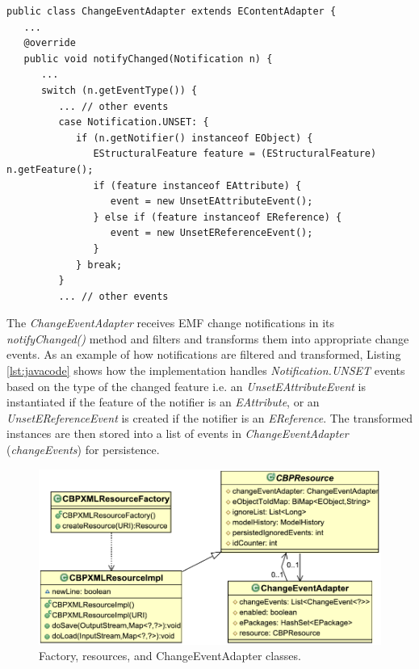 \documentclass[12pt, a4paper]{report} \usepackage[titletoc]{appendix}
\begin{document}
\begin{lstlisting}[style=java,caption={Simplified Java code to handle notification events.},label=lst:javacode]
public class ChangeEventAdapter extends EContentAdapter {
   ...
   @override
   public void notifyChanged(Notification n) {
      ...
      switch (n.getEventType()) {
         ... // other events
         case Notification.UNSET: {
            if (n.getNotifier() instanceof EObject) {
               EStructuralFeature feature = (EStructuralFeature) n.getFeature();
               if (feature instanceof EAttribute) {
                  event = new UnsetEAttributeEvent();
               } else if (feature instanceof EReference) {
                  event = new UnsetEReferenceEvent();
               }
            } break;
         } 
         ... // other events
\end{lstlisting}

The \emph{ChangeEventAdapter} receives EMF change notifications in its \emph{notifyChanged()} method and filters and transforms them into appropriate change events. As an example of how notifications are filtered and transformed, Listing \ref{lst:javacode} shows how the implementation handles \emph{Notification.UNSET} events based on the type of the changed feature i.e. an \emph{UnsetEAttributeEvent} is instantiated if the feature of the notifier is an \emph{EAttribute}, or an \emph{UnsetEReferenceEvent} is created if the notifier is an \emph{EReference}. The transformed instances are then stored into a list of events in \emph{ChangeEventAdapter} (\emph{changeEvents}) for persistence. 

\begin{figure}[th]
	\centering
	\includegraphics[width=0.6\linewidth]{resources}
	\caption{Factory, resources, and ChangeEventAdapter classes.}
	\label{fig:resources}
\end{figure}
\end{document}
